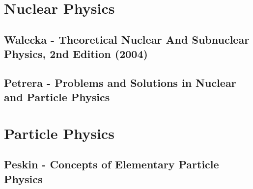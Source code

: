 \documentclass[10pt,a4paper]{book}
\theoremstyle{definition}
\begin{document}
\chapter{Nuclear Physics}
\section{{\sc Walecka} - Theoretical Nuclear And Subnuclear Physics, 2nd Edition (2004)}

\section{{\sc Petrera} - Problems and Solutions in Nuclear and Particle Physics}

\chapter{Particle Physics}

\section{{\sc Peskin} - Concepts of Elementary Particle Physics}
\end{document}
